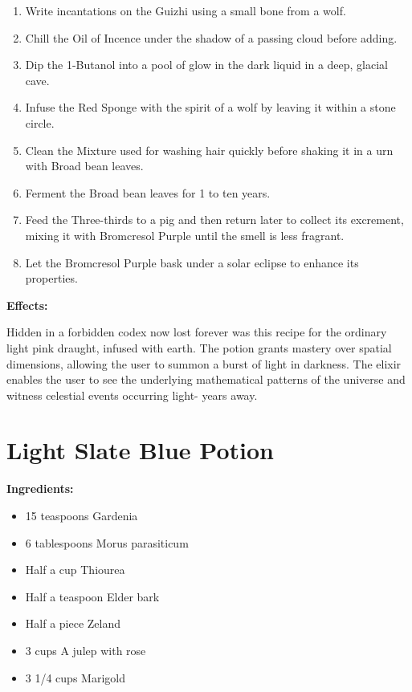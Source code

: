 \documentclass{article}
\begin{document}
\begin{enumerate}
  \item Write incantations on the Guizhi using a small bone from a wolf.
  \item Chill the Oil of Incence under the shadow of a passing cloud before adding.
  \item Dip the 1-Butanol into a pool of glow in the dark liquid in a deep, glacial cave.
  \item Infuse the Red Sponge with the spirit of a wolf by leaving it within a stone circle.
  \item Clean the Mixture used for washing hair quickly before shaking it in a urn with Broad bean leaves.
  \item Ferment the Broad bean leaves for 1 to ten years.
  \item Feed the Three-thirds to a pig and then return later to collect its excrement, mixing it with Bromcresol Purple until the smell is less fragrant.
  \item Let the Bromcresol Purple bask under a solar eclipse to enhance its properties.
\end{enumerate}

\textbf{Effects:}

Hidden in a forbidden codex now lost forever was this recipe for the ordinary light pink draught, infused with earth. The potion grants mastery over spatial dimensions, allowing the user to summon a burst of light in darkness. The elixir enables the user to see the underlying mathematical patterns of the universe and witness celestial events occurring light- years away.

\newpage
\section*{Light Slate Blue Potion}

\textbf{Ingredients:}

\begin{itemize}
  \item 15 teaspoons Gardenia
  \item 6 tablespoons Morus parasiticum
  \item Half a cup Thiourea
  \item Half a teaspoon Elder bark
  \item Half a piece Zeland
  \item 3 cups A julep with rose
  \item 3 1/4 cups Marigold
\end{itemize}
\end{document}
